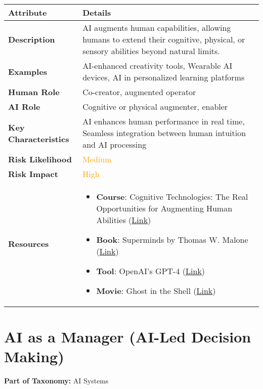 \documentclass{article}
\begin{document}
\begin{longtable}{|p{4cm}|p{10cm}|}
\hline
\textbf{Attribute} & \textbf{Details} \\
\hline
\textbf{Description} & AI augments human capabilities, allowing humans to extend their cognitive, physical, or sensory abilities beyond natural limits. \\
\hline
\textbf{Examples} & AI-enhanced creativity tools, Wearable AI devices, AI in personalized learning platforms \\
\hline
\textbf{Human Role} & Co-creator, augmented operator \\
\hline
\textbf{AI Role} & Cognitive or physical augmenter, enabler \\
\hline
\textbf{Key Characteristics} & AI enhances human performance in real time, Seamless integration between human intuition and AI processing \\
\hline
\textbf{Risk Likelihood} & \textcolor{orange}{Medium} \\
\hline
\textbf{Risk Impact} & \textcolor{orange}{High} \\
\hline
\textbf{Resources} & \begin{itemize}
  \item \textbf{Course}: Cognitive Technologies: The Real Opportunities for Augmenting Human Abilities (\href{https://www.linkedin.com/learning/cognitive-technologies}{Link})
  \item \textbf{Book}: Superminds by Thomas W. Malone (\href{https://www.amazon.com/dp/0316349135}{Link})
  \item \textbf{Tool}: OpenAI's GPT-4 (\href{https://openai.com/gpt-4}{Link})
  \item \textbf{Movie}: Ghost in the Shell (\href{https://www.imdb.com/title/tt0113568/}{Link})
\end{itemize} \\ \hline
\end{longtable}

\newpage
\section*{AI as a Manager (AI-Led Decision Making)}
\noindent \textbf{Part of Taxonomy:} AI Systems
\end{document}
